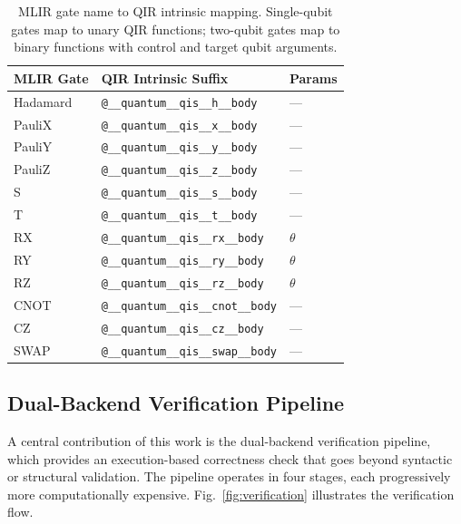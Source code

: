 \documentclass[conference]{IEEEtran}
\begin{document}
\begin{table}[htbp]
\centering
\caption{MLIR gate name to QIR intrinsic mapping. Single-qubit gates map to unary QIR functions; two-qubit gates map to binary functions with control and target qubit arguments.}
\label{tab:gate_mapping}
\renewcommand{\arraystretch}{1.1}
\begin{tabular}{@{}lll@{}}
\toprule
\textbf{MLIR Gate} & \textbf{QIR Intrinsic Suffix} & \textbf{Params} \\
\midrule
Hadamard       & \texttt{@\_\_quantum\_\_qis\_\_h\_\_body}       & --- \\
PauliX         & \texttt{@\_\_quantum\_\_qis\_\_x\_\_body}       & --- \\
PauliY         & \texttt{@\_\_quantum\_\_qis\_\_y\_\_body}       & --- \\
PauliZ         & \texttt{@\_\_quantum\_\_qis\_\_z\_\_body}       & --- \\
S              & \texttt{@\_\_quantum\_\_qis\_\_s\_\_body}       & --- \\
T              & \texttt{@\_\_quantum\_\_qis\_\_t\_\_body}       & --- \\
RX             & \texttt{@\_\_quantum\_\_qis\_\_rx\_\_body}      & $\theta$ \\
RY             & \texttt{@\_\_quantum\_\_qis\_\_ry\_\_body}      & $\theta$ \\
RZ             & \texttt{@\_\_quantum\_\_qis\_\_rz\_\_body}      & $\theta$ \\
CNOT           & \texttt{@\_\_quantum\_\_qis\_\_cnot\_\_body}    & --- \\
CZ             & \texttt{@\_\_quantum\_\_qis\_\_cz\_\_body}      & --- \\
SWAP           & \texttt{@\_\_quantum\_\_qis\_\_swap\_\_body}    & --- \\
\bottomrule
\end{tabular}
\end{table}
\subsection{Dual-Backend Verification Pipeline}\label{sec:verification}

A central contribution of this work is the dual-backend verification pipeline, which provides an execution-based correctness check that goes beyond syntactic or structural validation. The pipeline operates in four stages, each progressively more computationally expensive. Fig.~\ref{fig:verification} illustrates the verification flow.
\end{document}
